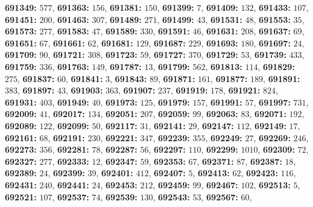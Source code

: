 \textsf{\bfseries 691349:} $577$, \textsf{\bfseries 691363:} $156$, \textsf{\bfseries 691381:} $150$, \textsf{\bfseries 691399:} $7$, \textsf{\bfseries 691409:} $132$, \textsf{\bfseries 691433:} $107$, \textsf{\bfseries 691451:} $200$, \textsf{\bfseries 691463:} $307$, \textsf{\bfseries 691489:} $271$, \textsf{\bfseries 691499:} $43$, \textsf{\bfseries 691531:} $48$, \textsf{\bfseries 691553:} $35$, \textsf{\bfseries 691573:} $277$, \textsf{\bfseries 691583:} $47$, \textsf{\bfseries 691589:} $330$, \textsf{\bfseries 691591:} $46$, \textsf{\bfseries 691631:} $208$, \textsf{\bfseries 691637:} $69$, \textsf{\bfseries 691651:} $67$, \textsf{\bfseries 691661:} $62$, \textsf{\bfseries 691681:} $129$, \textsf{\bfseries 691687:} $229$, \textsf{\bfseries 691693:} $180$, \textsf{\bfseries 691697:} $24$, \textsf{\bfseries 691709:} $90$, \textsf{\bfseries 691721:} $308$, \textsf{\bfseries 691723:} $59$, \textsf{\bfseries 691727:} $370$, \textsf{\bfseries 691729:} $53$, \textsf{\bfseries 691739:} $433$, \textsf{\bfseries 691759:} $336$, \textsf{\bfseries 691763:} $149$, \textsf{\bfseries 691787:} $13$, \textsf{\bfseries 691799:} $562$, \textsf{\bfseries 691813:} $114$, \textsf{\bfseries 691829:} $275$, \textsf{\bfseries 691837:} $60$, \textsf{\bfseries 691841:} $3$, \textsf{\bfseries 691843:} $89$, \textsf{\bfseries 691871:} $161$, \textsf{\bfseries 691877:} $189$, \textsf{\bfseries 691891:} $383$, \textsf{\bfseries 691897:} $43$, \textsf{\bfseries 691903:} $363$, \textsf{\bfseries 691907:} $237$, \textsf{\bfseries 691919:} $178$, \textsf{\bfseries 691921:} $824$, \textsf{\bfseries 691931:} $403$, \textsf{\bfseries 691949:} $40$, \textsf{\bfseries 691973:} $125$, \textsf{\bfseries 691979:} $157$, \textsf{\bfseries 691991:} $57$, \textsf{\bfseries 691997:} $731$, \textsf{\bfseries 692009:} $41$, \textsf{\bfseries 692017:} $134$, \textsf{\bfseries 692051:} $207$, \textsf{\bfseries 692059:} $99$, \textsf{\bfseries 692063:} $83$, \textsf{\bfseries 692071:} $192$, \textsf{\bfseries 692089:} $122$, \textsf{\bfseries 692099:} $50$, \textsf{\bfseries 692117:} $31$, \textsf{\bfseries 692141:} $29$, \textsf{\bfseries 692147:} $112$, \textsf{\bfseries 692149:} $17$, \textsf{\bfseries 692161:} $68$, \textsf{\bfseries 692191:} $230$, \textsf{\bfseries 692221:} $347$, \textsf{\bfseries 692239:} $355$, \textsf{\bfseries 692249:} $27$, \textsf{\bfseries 692269:} $246$, \textsf{\bfseries 692273:} $356$, \textsf{\bfseries 692281:} $78$, \textsf{\bfseries 692287:} $56$, \textsf{\bfseries 692297:} $110$, \textsf{\bfseries 692299:} $1010$, \textsf{\bfseries 692309:} $72$, \textsf{\bfseries 692327:} $277$, \textsf{\bfseries 692333:} $12$, \textsf{\bfseries 692347:} $59$, \textsf{\bfseries 692353:} $67$, \textsf{\bfseries 692371:} $87$, \textsf{\bfseries 692387:} $18$, \textsf{\bfseries 692389:} $24$, \textsf{\bfseries 692399:} $39$, \textsf{\bfseries 692401:} $412$, \textsf{\bfseries 692407:} $5$, \textsf{\bfseries 692413:} $62$, \textsf{\bfseries 692423:} $116$, \textsf{\bfseries 692431:} $240$, \textsf{\bfseries 692441:} $24$, \textsf{\bfseries 692453:} $212$, \textsf{\bfseries 692459:} $99$, \textsf{\bfseries 692467:} $102$, \textsf{\bfseries 692513:} $5$, \textsf{\bfseries 692521:} $107$, \textsf{\bfseries 692537:} $74$, \textsf{\bfseries 692539:} $130$, \textsf{\bfseries 692543:} $53$, \textsf{\bfseries 692567:} $60$, 
